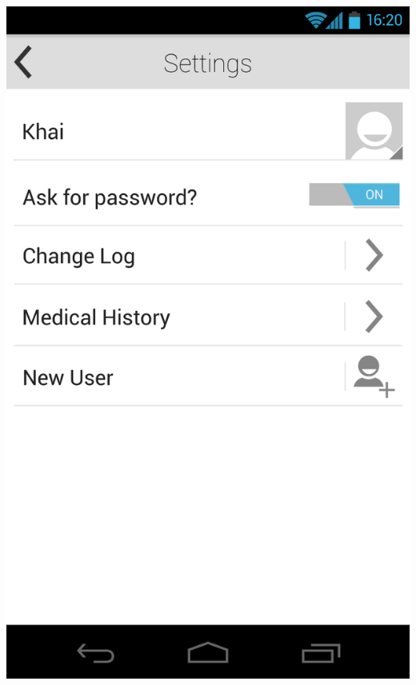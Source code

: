 \documentclass[pdftex,12pt,a4paper]{report}
\begin{document}
\begin{center}
	\includegraphics[scale=0.18]{Screens/04-Settings--Null.png}

\end{center}
\end{document}
